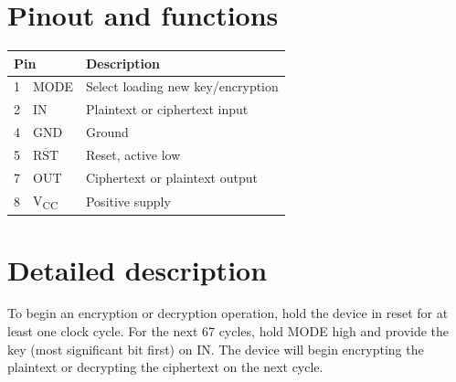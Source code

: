 \documentclass{article}
\begin{document}
\begin{multicols}{2}

  \section{Pinout and functions}


  \begin{center}
    \footnotesize
    \begin{tabular}{lll}
      \toprule
      \multicolumn{2}{l}{\textbf{Pin}} & \textbf{Description} \\
      \midrule
      1 & MODE & Select loading new key/encryption \\
      2 & IN & Plaintext or ciphertext input \\
      4 & GND & Ground \\
      5 & $\overline{\mbox{RST}}$ & Reset, active low \\
      7 & OUT & Ciphertext or plaintext output \\
      8 & V\textsubscript{CC} & Positive supply \\
      \bottomrule
    \end{tabular}
  \end{center}

  \section{Detailed description}

  To begin an encryption or decryption operation, hold the device in reset for at least one clock cycle.  For the next 67 cycles, hold MODE high and provide the key (most significant bit first) on IN.  The device will begin encrypting the plaintext or decrypting the ciphertext on the next cycle.

  \begin{center}
    
  \end{center}


\end{multicols}
\end{document}
